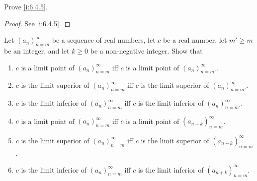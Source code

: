 \exercisesection

\begin{ex}\label{i:ex:6.4.1}
  Prove \cref{i:6.4.5}.
\end{ex}

\begin{proof}
  See \cref{i:6.4.5}.
\end{proof}

\begin{ex}\label{i:ex:6.4.2}
  Let \((a_n)_{n = m}^\infty\) be a sequence of real numbers, let \(c\) be a real number, let \(m' \geq m\) be an integer, and let \(k \geq 0\) be a non-negative integer.
  Show that
  \begin{enumerate}
    \item \(c\) is a limit point of \((a_n)_{n = m}^\infty\) iff \(c\) is a limit point of \((a_n)_{n = m'}^\infty\).
    \item \(c\) is the limit superior of \((a_n)_{n = m}^\infty\) iff \(c\) is the limit superior of \((a_n)_{n = m'}^\infty\).
    \item \(c\) is the limit inferior of \((a_n)_{n = m}^\infty\) iff \(c\) is the limit inferior of \((a_n)_{n = m'}^\infty\).
    \item \(c\) is a limit point of \((a_n)_{n = m}^\infty\) iff \(c\) is a limit point of \((a_{n + k})_{n = m}^\infty\).
    \item \(c\) is the limit superior of \((a_n)_{n = m}^\infty\) iff \(c\) is the limit superior of \((a_{n + k})_{n = m}^\infty\).
    \item \(c\) is the limit inferior of \((a_n)_{n = m}^\infty\) iff \(c\) is the limit inferior of \((a_{n + k})_{n = m}^\infty\).
  \end{enumerate}
\end{ex}

